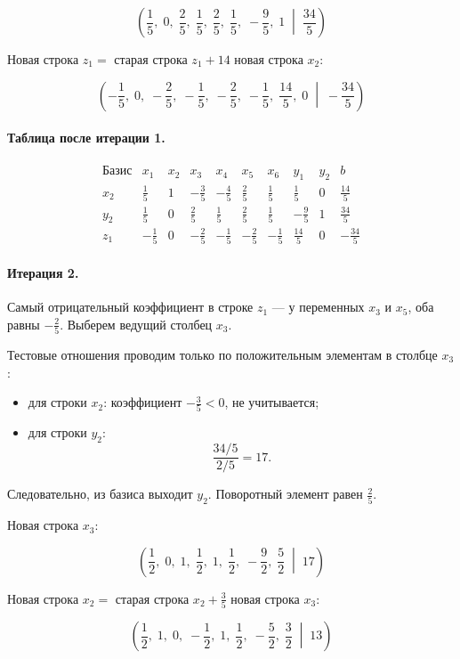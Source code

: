 \documentclass[a4paper,14pt]{extarticle}
\begin{document}
\[
\left(
\frac15,\;0,\;\frac25,\;\frac15,\;\frac25,\;\frac15,\;-\frac95,\;1
\;\middle|\;
\frac{34}{5}
\right)
\]

Новая строка \(z_1 =\) старая строка \(z_1 + 14\) новая строка \(x_2\):

\[
\left(
-\frac15,\;0,\;-\frac25,\;-\frac15,\;-\frac25,\;-\frac15,\;\frac{14}{5},\;0
\;\middle|\;
-\frac{34}{5}
\right)
\]

\paragraph{Таблица после итерации 1.}

\[
\begin{array}{c|rrrrrrrr|r}
\text{Базис} & x_1 & x_2 & x_3 & x_4 & x_5 & x_6 & y_1 & y_2 & b\\
\hline
x_2 & \frac15 & 1 & -\frac35 & -\frac45 & \frac25 & \frac15 & \frac15 & 0 & \frac{14}{5}\\
y_2 & \frac15 & 0 & \frac25 & \frac15 & \frac25 & \frac15 & -\frac95 & 1 & \frac{34}{5}\\
z_1 & -\frac15 & 0 & -\frac25 & -\frac15 & -\frac25 & -\frac15 & \frac{14}{5} & 0 & -\frac{34}{5}
\end{array}
\]

\paragraph{Итерация 2.}
Самый отрицательный коэффициент в строке \(z_1\) — у переменных \(x_3\) и \(x_5\), оба равны \(-\frac25\). Выберем ведущий столбец \(x_3\).

Тестовые отношения проводим только по положительным элементам в столбце \(x_3\):
\begin{itemize}
    \item для строки \(x_2\): коэффициент \(-\frac35<0\), не учитывается;
    \item для строки \(y_2\):
    \[
    \frac{34/5}{2/5}=17.
    \]
\end{itemize}

Следовательно, из базиса выходит \(y_2\). Поворотный элемент равен \(\frac25\).

Новая строка \(x_3\):

\[
\left(
\frac12,\;0,\;1,\;\frac12,\;1,\;\frac12,\;-\frac92,\;\frac52
\;\middle|\;
17
\right)
\]

Новая строка \(x_2 =\) старая строка \(x_2 + \frac35\) новая строка \(x_3\):

\[
\left(
\frac12,\;1,\;0,\;-\frac12,\;1,\;\frac12,\;-\frac52,\;\frac32
\;\middle|\;
13
\right)
\]
\end{document}

